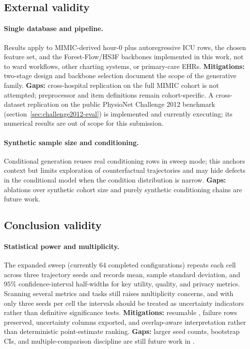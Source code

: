\subsection{External validity}

\paragraph{Single database and pipeline.}
Results apply to MIMIC-derived hour-0 plus autoregressive ICU rows, the chosen feature set, and the Forest-Flow/HS3F backbones implemented in this work, not to ward workflows, other charting systems, or primary-care EHRs.
\textbf{Mitigations:} two-stage design and backbone selection document the scope of the generative family.
\textbf{Gaps:} cross-hospital replication on the full MIMIC cohort is not attempted; preprocessor and item definitions remain cohort-specific. A cross-dataset replication on the public PhysioNet Challenge 2012 benchmark (section~\ref{sec:challenge2012-eval}) is implemented and currently executing; its numerical results are out of scope for this submission.

\paragraph{Synthetic sample size and conditioning.}
Conditional generation reuses real conditioning rows in sweep mode; this anchors context but limits exploration of counterfactual trajectories and may hide defects in the conditional model when the condition distribution is narrow.
\textbf{Gaps:} ablations over synthetic cohort size and purely synthetic conditioning chains are future work.

\subsection{Conclusion validity}

\paragraph{Statistical power and multiplicity.}
The expanded sweep (currently $64$ completed configurations) repeats each cell across three trajectory seeds and records mean, sample standard deviation, and $95\%$ confidence-interval half-widths for key utility, quality, and privacy metrics.
Scanning several metrics and tasks still raises multiplicity concerns, and with only three seeds per cell the intervals should be treated as uncertainty indicators rather than definitive significance tests.
\textbf{Mitigations:} resumable , failure rows preserved, uncertainty columns exported, and overlap-aware interpretation rather than deterministic point-estimate ranking.
\textbf{Gaps:} larger seed counts, bootstrap CIs, and multiple-comparison discipline are still future work in .

